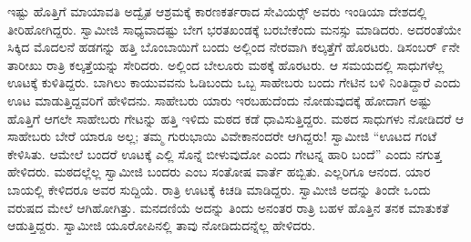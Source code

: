  ಇಷ್ಟು ಹೊತ್ತಿಗೆ ಮಾಯಾವತಿ ಅದ್ವೈತ ಆಶ್ರಮಕ್ಕೆ ಕಾರಣಕರ್ತರಾದ ಸೇವಿಯರ್ಸ್‍‍ ಅವರು ಇಂಡಿಯಾ ದೇಶದಲ್ಲಿ ತೀರಿಹೋಗಿದ್ದರು. ಸ್ವಾಮೀಜಿ ಸಾಧ್ಯವಾದಷ್ಟು ಬೇಗ ಭರತಖಂಡಕ್ಕೆ ಬರಬೇಕೆಂದು ಮನಸ್ಸು ಮಾಡಿದರು. ಅದರಂತೆಯೇ ಸಿಕ್ಕಿದ ಮೊದಲನೆ ಹಡಗನ್ನು ಹತ್ತಿ ಬೊಂಬಾಯಿಗೆ ಬಂದು ಅಲ್ಲಿಂದ ನೇರವಾಗಿ ಕಲ್ಕತ್ತೆಗೆ ಹೊರಟರು. ಡಿಸಂಬರ್ ೯ನೇ ತಾರೀಖು ರಾತ್ರಿ ಕಲ್ಕತ್ತೆಯನ್ನು ಸೇರಿದರು. ಅಲ್ಲಿಂದ ಬೇಲೂರು ಮಠಕ್ಕೆ ಹೊರಟರು. ಆ ಸಮಯದಲ್ಲಿ ಸಾಧುಗಳೆಲ್ಲ ಊಟಕ್ಕೆ ಕುಳಿತಿದ್ದರು. ಬಾಗಿಲು ಕಾಯುವವನು ಓಡಿಬಂದು ಒಬ್ಬ ಸಾಹೇಬರು ಬಂದು ಗೇಟಿನ ಬಳಿ ನಿಂತಿದ್ದಾರೆ ಎಂದು ಊಟ ಮಾಡುತ್ತಿದ್ದವರಿಗೆ ಹೇಳಿದನು. ಸಾಹೇಬರು ಯಾರು ಇರಬಹುದೆಂದು ನೋಡುವುದಕ್ಕೆ ಹೋದಾಗ ಅಷ್ಟು ಹೊತ್ತಿಗೆ ಆಗಲೇ ಸಾಹೇಬರು ಗೇಟನ್ನು ಹತ್ತಿ ಇಳಿದು ಮಠದ ಕಡೆ ಧಾವಿಸುತ್ತಿದ್ದರು. ಮಠದ ಸಾಧುಗಳು ನೋಡಿದರೆ ಆ ಸಾಹೇಬರು ಬೇರೆ ಯಾರೂ ಅಲ್ಲ; ತಮ್ಮ ಗುರುಭಾಯಿ ವಿವೇಕಾನಂದರೇ ಆಗಿದ್ದರು! ಸ್ವಾಮೀಜಿ “ಊಟದ ಗಂಟೆ ಕೇಳಿಸಿತು. ಆಮೇಲೆ ಬಂದರೆ ಊಟಕ್ಕೆ ಎಲ್ಲಿ ಸೊನ್ನೆ ಬೀಳುವುದೋ ಎಂದು ಗೇಟನ್ನ ಹಾರಿ ಬಂದೆ” ಎಂದು ನಗುತ್ತ ಹೇಳಿದರು. ಮಠದಲ್ಲೆಲ್ಲ ಸ್ವಾಮೀಜಿ ಬಂದರು ಎಂಬ ಸಂತೋಷ ವಾರ್ತೆ ಹಬ್ಬಿತು. ಎಲ್ಲರಿಗೂ ಆನಂದ. ಯಾರ ಬಾಯಲ್ಲಿ ಕೇಳಿದರೂ ಅವರ ಸುದ್ದಿಯೆ. ರಾತ್ರಿ ಊಟಕ್ಕೆ ಕಿಚಡಿ ಮಾಡಿದ್ದರು. ಸ್ವಾಮೀಜಿ ಅದನ್ನು ತಿಂದೇ ಒಂದು ವರುಷದ ಮೇಲೆ ಆಗಿಹೋಗಿತ್ತು. ಮನದಣಿಯೆ ಅದನ್ನು ತಿಂದು ಅನಂತರ ರಾತ್ರಿ ಬಹಳ ಹೊತ್ತಿನ ತನಕ ಮಾತುಕತೆ ಆಡುತ್ತಿದ್ದರು. ಸ್ವಾಮೀಜಿ ಯೂರೋಪಿನಲ್ಲಿ ತಾವು ನೋಡಿದುದನ್ನೆಲ್ಲ ಹೇಳಿದರು. 

